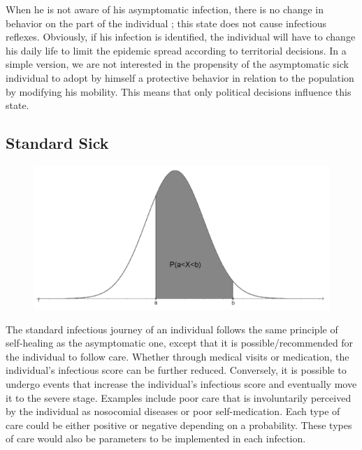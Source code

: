 When he is not aware of his asymptomatic infection, there is no change in behavior on the part of the individual ; this state does not cause infectious reflexes. Obviously, if his infection is identified, the individual will have to change his daily life to limit the epidemic spread according to territorial decisions. In a simple version, we are not interested in the propensity of the asymptomatic sick individual to adopt by himself a protective behavior in relation to the population by modifying his mobility. This means that only political decisions influence this state.\\

\subsection{Standard Sick}

\begin{figure}
  \centering
  \includegraphics[trim = 234 0 184 0, clip, width=\linewidth]{Media/LoiGauss.png}
\end{figure}

The standard infectious journey of an individual follows the same principle of self-healing as the asymptomatic one, except that it is possible/recommended for the individual to follow care. Whether through medical visits or medication, the individual's infectious score can be further reduced. Conversely, it is possible to undergo events that increase the individual's infectious score and eventually move it to the severe stage. Examples include poor care that is involuntarily perceived by the individual as nosocomial diseases or poor self-medication. Each type of care could be either positive or negative depending on a probability. These types of care would also be parameters to be implemented in each infection.\\

